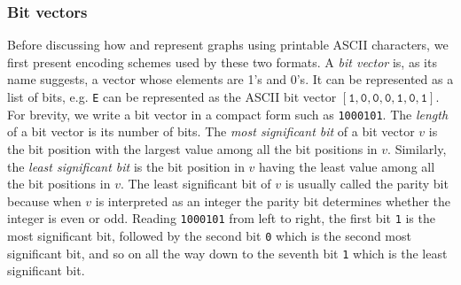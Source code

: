 
\subsubsection{Bit vectors}

Before discussing how \graphsix\index{\graphsix} and
\sparsesix\index{\sparsesix} represent graphs using printable
ASCII characters, we first present encoding schemes used
by these two formats. A \emph{bit vector} is, as its
name suggests, a vector whose elements are 1's and 0's. It can be
represented as a list of bits, e.g. \verb!E! can be
represented as the ASCII bit vector
$[
  \texttt{1}, \texttt{0}, \texttt{0}, \texttt{0}, \texttt{1},
  \texttt{0}, \texttt{1}
]$. For brevity, we write a bit vector in a compact form such as
\texttt{1000101}. The \emph{length} of a bit
vector is its number of bits. The
\emph{most significant bit} of a bit
vector $v$ is the bit position with the largest value among all the
bit positions in $v$. Similarly, the
\emph{least significant bit} is the bit
position in $v$ having the least value among all the bit positions in
$v$. The least significant bit of $v$ is usually called the parity
bit because when $v$ is interpreted as an integer
the parity bit determines whether the integer is even or odd. Reading
\texttt{1000101} from left to right, the first bit \texttt{1} is the
most significant bit, followed by the second bit \texttt{0} which is
the second most significant bit, and so on all the way down to the
seventh bit \texttt{1} which is the least significant bit.

